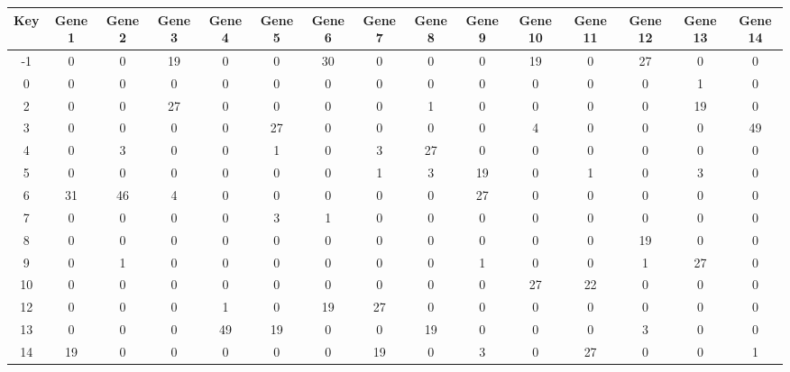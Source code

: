\begin{tabular}{|c|c|c|c|c|c|c|c|c|c|c|c|c|c|c|}
\hline
Key & Gene 1 & Gene 2 & Gene 3 & Gene 4 & Gene 5 & Gene 6 & Gene 7 & Gene 8 & Gene 9 & Gene 10 & Gene 11 & Gene 12 & Gene 13 & Gene 14 \\
\hline
-1 & 0 & 0 & 19 & 0 & 0 & 30 & 0 & 0 & 0 & 19 & 0 & 27 & 0 & 0 \\
0 & 0 & 0 & 0 & 0 & 0 & 0 & 0 & 0 & 0 & 0 & 0 & 0 & 1 & 0 \\
2 & 0 & 0 & 27 & 0 & 0 & 0 & 0 & 1 & 0 & 0 & 0 & 0 & 19 & 0 \\
3 & 0 & 0 & 0 & 0 & 27 & 0 & 0 & 0 & 0 & 4 & 0 & 0 & 0 & 49 \\
4 & 0 & 3 & 0 & 0 & 1 & 0 & 3 & 27 & 0 & 0 & 0 & 0 & 0 & 0 \\
5 & 0 & 0 & 0 & 0 & 0 & 0 & 1 & 3 & 19 & 0 & 1 & 0 & 3 & 0 \\
6 & 31 & 46 & 4 & 0 & 0 & 0 & 0 & 0 & 27 & 0 & 0 & 0 & 0 & 0 \\
7 & 0 & 0 & 0 & 0 & 3 & 1 & 0 & 0 & 0 & 0 & 0 & 0 & 0 & 0 \\
8 & 0 & 0 & 0 & 0 & 0 & 0 & 0 & 0 & 0 & 0 & 0 & 19 & 0 & 0 \\
9 & 0 & 1 & 0 & 0 & 0 & 0 & 0 & 0 & 1 & 0 & 0 & 1 & 27 & 0 \\
10 & 0 & 0 & 0 & 0 & 0 & 0 & 0 & 0 & 0 & 27 & 22 & 0 & 0 & 0 \\
12 & 0 & 0 & 0 & 1 & 0 & 19 & 27 & 0 & 0 & 0 & 0 & 0 & 0 & 0 \\
13 & 0 & 0 & 0 & 49 & 19 & 0 & 0 & 19 & 0 & 0 & 0 & 3 & 0 & 0 \\
14 & 19 & 0 & 0 & 0 & 0 & 0 & 19 & 0 & 3 & 0 & 27 & 0 & 0 & 1 \\
\hline
\end{tabular}